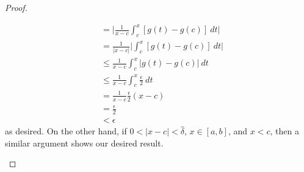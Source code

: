 \begin{proof}
\begin{enumerate}
\begin{enumerate}
\begin{align*}
                        &= \Big| \frac{ 1 }{ x - c  } \int_{ c  }^{  x  } [g(t) - g(c)] \ dt  \Big| \\
                        &= \frac{ 1 }{ | x - c  |  }  \Big| \int_{ c }^{ x }  [g(t) - g(c)] \ dt   \Big|  \\
                        &\leq \frac{ 1 }{ x - c  }  \int_{ c }^{ x }  | g(t) - g(c) |  \ dt \\
                        &\leq \frac{ 1 }{ x - c  }  \int_{ c }^{ x }  \frac{ \epsilon }{ 2 }   \ dt \\
                        &= \frac{ 1 }{ x - c  }  \frac{ \epsilon }{ 2 }  (x - c ) \\
                        &= \frac{ \epsilon }{ 2 }  \\
                        &< \epsilon
                    \end{align*}
                    as desired. On the other hand, if \( 0 < | x - c  |  < \hat{\delta} \), \( x \in [a,b] \), and \( x < c  \), then a similar argument shows our desired result.

            \end{enumerate}
    \end{enumerate}

    \end{proof}

